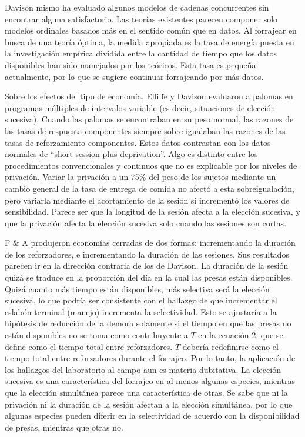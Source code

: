 \documentclass[a4paper,12pt]{article}
\begin{document}
Davison mismo ha evaluado algunos modelos de cadenas concurrentes sin encontrar alguna satisfactorio. Las teorías existentes parecen componer solo modelos ordinales basados más en el sentido común que en datos. Al forrajear en busca de una teoría óptima, la medida apropiada es la tasa de energía puesta en la investigación empírica dividida entre la cantidad de tiempo que los datos disponibles han sido manejados por los teóricos. Esta tasa es pequeña actualmente, por lo que se sugiere continuar forrajeando por más datos.

Sobre los efectos del tipo de economía, Elliffe y Davison evaluaron a palomas en programas múltiples de intervalos variable (es decir, situaciones de elección sucesiva). Cuando las palomas se encontraban en su peso normal, las razones de las tasas de respuesta componentes siempre sobre-igualaban las razones de las tasas de reforzamiento componentes. Estos datos contrastan con los datos normales de ``short session plus deprivation''. Algo es distinto entre los procedimientos convencionales y continuos que no es explicable por los niveles de privación. Variar la privación a un 75\% del peso de los sujetos mediante un cambio general de la tasa de entrega de comida no afectó a esta sobreigualación, pero variarla mediante el acortamiento de la sesión sí incrementó los valores de sensibilidad. Parece ser que la longitud de la sesión afecta a la elección sucesiva, y que la privación afecta la elección sucesiva solo cuando las sesiones son cortas.

F \& A produjeron economías cerradas de dos formas: incrementando la duración de los reforzadores, e incrementando la duración de las sesiones. Sus resultados parecen ir en la dirección contraria de los de Davison. La duración de la sesión quizá se traduce en la proporción del día en la cual las presas están disponibles. Quizá cuanto más tiempo están disponibles, más selectiva será la elección sucesiva, lo que podría ser consistente con el hallazgo de que incrementar el eslabón terminal (manejo) incrementa la selectividad. Esto se ajustaría a la hipótesis de reducción de la demora solamente si el tiempo en que las presas no están disponibles no se toma como contribuyente a $T$ en la ecuación 2, que se define como el tiempo total entre reforzadores. $T$ debería redefinirse como el tiempo total entre reforzadores durante el forrajeo. Por lo tanto, la aplicación de los hallazgos del laboratorio al campo aun es materia dubitativa. La elección sucesiva es una característica del forrajeo en al menos algunas especies, mientras que la elección simultánea parece una característica de otras. Se sabe que ni la privación ni la duración de la sesión afectan a la elección simultánea, por lo que algunas especies pueden diferir en la selectividad de acuerdo con la disponibilidad de presas, mientras que otras no.
\end{document}
